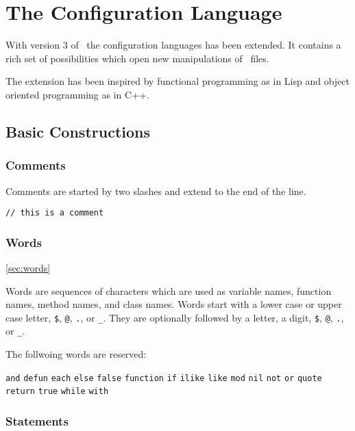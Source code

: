 \documentclass[11pt,a4paper]{scrbook}
\newcommand\keyword[1]{\texttt{#1}}
\begin{document}

\chapter{The  Configuration Language}

With version 3 of \BibTool\ the configuration languages has been extended. It
contains a rich set of possibilities which open new manipulations of \BibTeX\
files.

The extension has been inspired by functional programming as in Lisp and
object oriented programming as in C++.

\section{Basic Constructions}


\subsection{Comments}

Comments are started by two slashes and extend to the end of the line.

\begin{lstlisting}[language=BibTool]
// this is a comment
\end{lstlisting}

\subsection{Words}\ref{sec:words}

Words are sequences of characters which are used as variable names, function
names, method names, and class names. Words start with a lower case or upper
case letter, \verb|$|, \verb|@|, \verb|.|, or \verb|_|. They are optionally
followed by a letter, a digit, \verb|$|, \verb|@|, \verb|.|, or \verb|_|.

The follwoing words are reserved:

\keyword{and}
\keyword{defun}
\keyword{each}
\keyword{else}
\keyword{false}
\keyword{function}
\keyword{if}
\keyword{ilike}
\keyword{like}
\keyword{mod}
\keyword{nil}
\keyword{not}
\keyword{or}
\keyword{quote}
\keyword{return}
\keyword{true}
\keyword{while}
\keyword{with}

\subsection{Statements}
\end{document}

